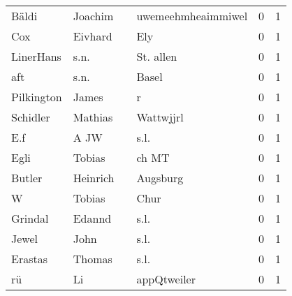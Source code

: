 \documentclass[10pt,a4paper,landscape]{article}
\begin{document}
\begin{longtable}{llllrr}
                    Bäldi &                            Joachim &             &                          uwemeehmheaimmiwel &          0 &         1 \\
                      Cox &                            Eivhard &             &                                         Ely &          0 &         1 \\
                LinerHans &                               s.n. &             &                                   St. allen &          0 &         1 \\
                      aft &                               s.n. &             &                                       Basel &          0 &         1 \\
               Pilkington &                              James &             &                                           r &          0 &         1 \\
                 Schidler &                            Mathias &             &                                   Wattwjjrl &          0 &         1 \\
                      E.f &                               A JW &             &                                        s.l. &          0 &         1 \\
                     Egli &                             Tobias &             &                                       ch MT &          0 &         1 \\
                   Butler &                           Heinrich &             &                                    Augsburg &          0 &         1 \\
                        W &                             Tobias &             &                                        Chur &          0 &         1 \\
                  Grindal &                             Edannd &             &                                        s.l. &          0 &         1 \\
                    Jewel &                               John &             &                                        s.l. &          0 &         1 \\
                  Erastas &                             Thomas &             &                                        s.l. &          0 &         1 \\
                       rü &                                 Li &             &                                 appQtweiler &          0 &         1 \\

\end{longtable}
\end{document}
